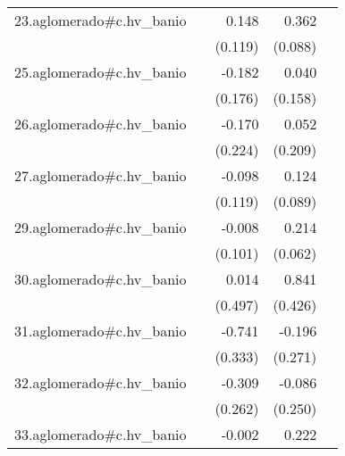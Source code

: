 {\begin{longtable}{l*{4}{D{.}{.}{-1}}}
\addlinespace
23.aglomerado#c.hv\_banio&                     &       0.148         &       0.362\sym{***}&                     \\
            &                     &     (0.119)         &     (0.088)         &                     \\
\addlinespace
25.aglomerado#c.hv\_banio&                     &      -0.182         &       0.040         &                     \\
            &                     &     (0.176)         &     (0.158)         &                     \\
\addlinespace
26.aglomerado#c.hv\_banio&                     &      -0.170         &       0.052         &                     \\
            &                     &     (0.224)         &     (0.209)         &                     \\
\addlinespace
27.aglomerado#c.hv\_banio&                     &      -0.098         &       0.124         &                     \\
            &                     &     (0.119)         &     (0.089)         &                     \\
\addlinespace
29.aglomerado#c.hv\_banio&                     &      -0.008         &       0.214\sym{***}&                     \\
            &                     &     (0.101)         &     (0.062)         &                     \\
\addlinespace
30.aglomerado#c.hv\_banio&                     &       0.014         &       0.841\sym{*}  &                     \\
            &                     &     (0.497)         &     (0.426)         &                     \\
\addlinespace
31.aglomerado#c.hv\_banio&                     &      -0.741\sym{*}  &      -0.196         &                     \\
            &                     &     (0.333)         &     (0.271)         &                     \\
\addlinespace
32.aglomerado#c.hv\_banio&                     &      -0.309         &      -0.086         &                     \\
            &                     &     (0.262)         &     (0.250)         &                     \\
\addlinespace
33.aglomerado#c.hv\_banio&                     &      -0.002         &       0.222\sym{***}&                     \\

\end{longtable}}
